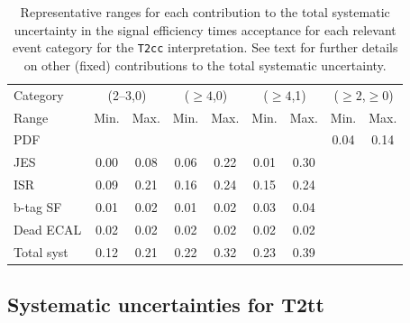 \begin{table}[h!]
  \caption{Representative ranges for each contribution to the total
    systematic uncertainty in the signal efficiency times acceptance
    for each relevant event category for the \texttt{T2cc}
    interpretation. See text for further details on other
    (fixed) contributions to the total systematic uncertainty. 
    \label{tab:sms-syst-t2cc}
  }   
  \centering
  \begin{tabular}{ lcccccccc }
    \hline
    \hline
    Category   & \multicolumn{2}{c}{(2--3,0)} & \multicolumn{2}{c}{($\geq 4$,0)} & \multicolumn{2}{c}{($\geq 4$,1)} & \multicolumn{2}{c}{($\geq 2$,$\geq 0$)} \\
    Range      & Min.                         & Max.                             & Min.                             & Max. & Min. & Max. & Min. & Max.        \\
    \hline
    PDF        &                              &                                  &                                  &      &      &      & 0.04 & 0.14        \\
    JES        & 0.00                         & 0.08                             & 0.06                             & 0.22 & 0.01 & 0.30 &      &             \\
    ISR        & 0.09                         & 0.21                             & 0.16                             & 0.24 & 0.15 & 0.24 &      &             \\
    b-tag SF   & 0.01                         & 0.02                             & 0.01                             & 0.02 & 0.03 & 0.04 &      &             \\
    Dead ECAL  & 0.02                         & 0.02                             & 0.02                             & 0.02 & 0.02 & 0.02 &      &             \\
    \hline
    Total syst & 0.12                         & 0.21                             & 0.22                             & 0.32 & 0.23 & 0.39 &      &             \\
    \hline
    \hline
  \end{tabular}
\end{table}

\subsection{Systematic uncertainties for T2tt\label{sec:sms-t2tt}}

